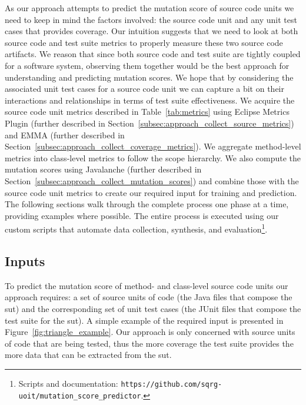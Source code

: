 As our approach attempts to predict the mutation score of source code units we need to keep in mind the factors involved: the source code unit and any unit test cases that provides coverage. Our intuition suggests that we need to look at both source code and test suite metrics to properly measure these two source code artifacts. We reason that since both source code and test suite are tightly coupled for a software system, observing them together would be the best approach for understanding and predicting mutation scores. We hope that by considering the associated unit test cases for a source code unit we can capture a bit on their interactions and relationships in terms of test suite effectiveness. We acquire the source code unit metrics described in Table~\ref{tab:metrics} using Eclipse Metrics Plugin (further described in Section~\ref{subsec:approach_collect_source_metrics}) and EMMA (further described in Section~\ref{subsec:approach_collect_coverage_metrics}). We aggregate method-level metrics into class-level metrics to follow the scope hierarchy. We also compute the mutation scores using Javalanche (further described in Section~\ref{subsec:approach_collect_mutation_scores}) and combine those with the source code unit metrics to create our required input for training and prediction. The following sections walk through the complete process one phase at a time, providing examples where possible. The entire process is executed using our custom scripts that automate data collection, synthesis, and evaluation\footnote{Scripts and documentation: \texttt{https://github.com/sqrg-uoit/mutation\_score\_predictor}.}.


\subsection{Inputs}
\label{subsec:approach_inputs}
To predict the mutation score of method- and class-level source code units our approach requires: a set of source units of code (the Java files that compose the \gls{sut}) and the corresponding set of unit test cases (the JUnit files that compose the test suite for the \gls{sut}). A simple example of the required input is presented in Figure~\ref{fig:triangle_example}. Our approach is only concerned with source units of code that are being tested, thus the more coverage the test suite provides the more data that can be extracted from the \gls{sut}.


